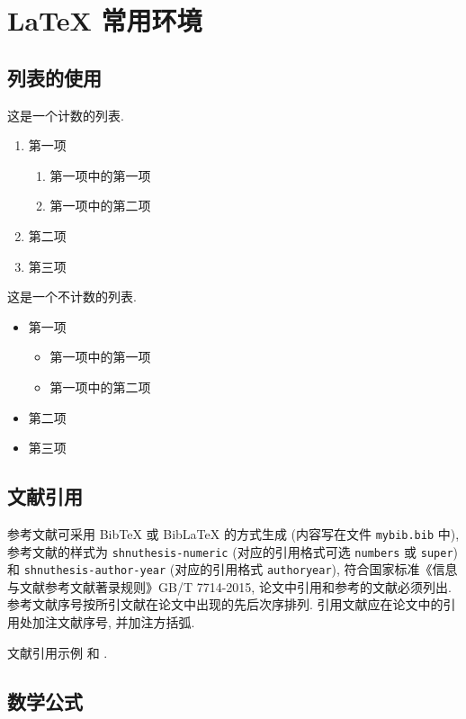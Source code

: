 

\chapter{LaTeX 常用环境}

\section{列表的使用}

这是一个计数的列表.
\begin{enumerate}%
	\item 第一项
		\begin{enumerate}
			\item 第一项中的第一项
			\item 第一项中的第二项
		\end{enumerate}
	\item 第二项
	\item 第三项
\end{enumerate}

这是一个不计数的列表.
\begin{itemize}%
	\item 第一项
	\begin{itemize}
		\item 第一项中的第一项
		\item 第一项中的第二项
	\end{itemize}
	\item 第二项
	\item 第三项
\end{itemize}


\section{文献引用}

参考文献可采用 BibTeX 或 BibLaTeX 的方式生成 (内容写在文件 \verb|mybib.bib| 中), 参考文献的样式为 \verb|shnuthesis-numeric| (对应的引用格式可选 \verb|numbers| 或  \verb|super|)和 \verb|shnuthesis-author-year| (对应的引用格式 \verb|authoryear|), 符合国家标准《信息与文献参考文献著录规则》GB/T 7714-2015, 论文中引用和参考的文献必须列出. 参考文献序号按所引文献在论文中出现的先后次序排列. 引用文献应在论文中的引用处加注文献序号, 并加注方括弧.

文献引用示例 \cite{LiLiu1997} 和 \cite{Adams2003,Shen1994}.


\section{数学公式}\label{sec:mathEqEnv}

